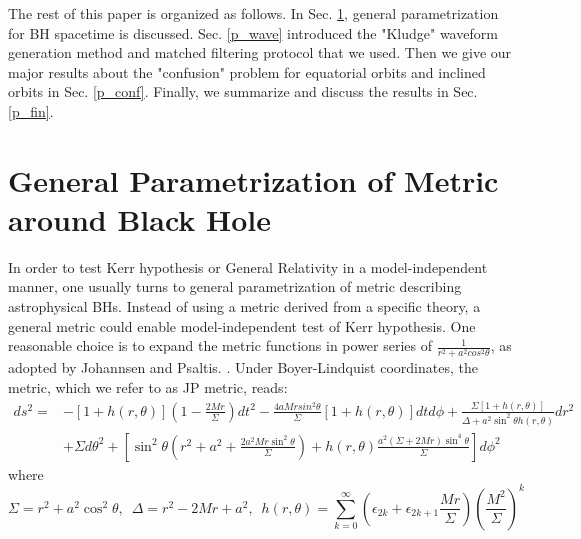 \documentclass{article}
\begin{document}
The rest of this paper is organized as follows. In Sec. \ref{p_krz}, general parametrization for BH spacetime is discussed. Sec. \ref{p_wave} introduced the "Kludge" waveform generation method and matched filtering protocol that we used. Then we give our major results about the "confusion" problem for equatorial orbits and inclined orbits in Sec. \ref{p_conf}. Finally, we summarize and discuss the results in Sec. \ref{p_fin}. 

\section{General Parametrization of Metric around Black Hole}
\label{p_krz}


In order to test Kerr hypothesis or General Relativity in a model-independent manner, one usually turns to general parametrization of metric describing astrophysical BHs. Instead of using a metric derived from a specific theory, a general metric could enable model-independent test of Kerr hypothesis. One reasonable choice is to expand the metric functions in power series of $\frac 1 {r^2+a^2cos^2\theta}$, as adopted by Johannsen and Psaltis. \cite{johannsen}. Under Boyer-Lindquist coordinates, the metric, which we refer to as JP metric, reads:
\begin{equation}
\begin{aligned}
	ds^2=&-[1+h(r,\theta)](1-\frac{2Mr}{\Sigma}) dt^2 - \frac{4aMrsin^2\theta}{\Sigma} [1+h(r,\theta)] dtd\phi + \frac{\Sigma[1+ h(r,\theta) ] }{ \Delta + a^2 \sin^2 \theta h(r,\theta )} dr^2  \\
	&+\Sigma d\theta^2 +[ \sin^2\theta (r^2+a^2 + \frac{2a^2Mr\sin^2\theta }{\Sigma}) + h(r,\theta ) \frac{a^2 (\Sigma +2Mr)\sin^4\theta  }{\Sigma} ] d\phi^2
\end{aligned}
\end{equation}
where
\begin{equation}
	\Sigma=r^2 +a^2\cos^2\theta,\,\,\,\Delta= r^2 - 2Mr +a^2 ,\,\,\,  h(r,\theta ) = \sum_{k=0}^{\infty} (\epsilon_{2k} + \epsilon_{2k+1} \frac{Mr}{\Sigma}) (\frac{M^2}{\Sigma})^k
\end{equation}
\end{document}
